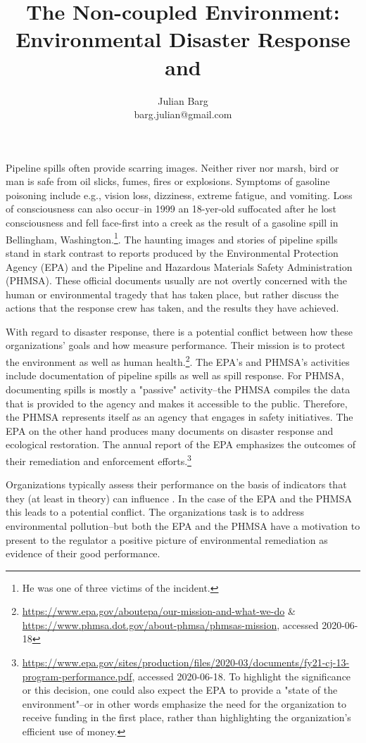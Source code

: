 \documentclass[12pt, man, natbib]{apa6}
\title{The Non-coupled Environment: Environmental Disaster Response and  }
\author{Julian Barg\\barg.julian@gmail.com}
\affiliation{Ivey Business School}
\begin{document}
	
	\maketitle
	
	\singlespacing
	
	\section{}

	Pipeline spills often provide scarring images. Neither river nor marsh, bird or man is safe from oil slicks, fumes, fires or explosions. Symptoms of gasoline poisoning include e.g., vision loss, dizziness, extreme fatigue, and vomiting. Loss of consciousness can also occur--in 1999 an 18-yer-old suffocated after he lost consciousness and fell face-first into a creek as the result of a gasoline spill in Bellingham, Washington.\footnote{He was one of three victims of the incident.}. The haunting images and stories of pipeline spills stand in stark contrast to reports produced by the Environmental Protection Agency (EPA) and the Pipeline and Hazardous Materials Safety Administration (PHMSA). These official documents usually are not overtly concerned with the human or environmental tragedy that has taken place, but rather discuss the actions that the response crew has taken, and the results they have achieved.
	
	With regard to disaster response, there is a potential conflict between how these organizations' goals and how measure performance. Their mission is to protect the environment as well as human health.\footnote{\url{https://www.epa.gov/aboutepa/our-mission-and-what-we-do} \& \url{https://www.phmsa.dot.gov/about-phmsa/phmsas-mission}, accessed 2020-06-18}. The EPA's and PHMSA's activities include documentation of pipeline spills as well as spill response. For PHMSA, documenting spills is mostly a "passive" activity--the PHMSA compiles the data that is provided to the agency and makes it accessible to the public. Therefore, the PHMSA represents itself as an agency that engages in safety initiatives. The EPA on the other hand produces many documents on disaster response and ecological restoration. The annual report of the EPA emphasizes the outcomes of their remediation and enforcement efforts.\footnote{\url{https://www.epa.gov/sites/production/files/2020-03/documents/fy21-cj-13-program-performance.pdf}, accessed 2020-06-18. To highlight the significance or this decision, one could also expect the EPA to provide a "state of the environment"--or in other words emphasize the need for the organization to receive funding in the first place, rather than highlighting the organization's efficient use of money.}
	
	Organizations typically assess their performance on the basis of indicators that they (at least in theory) can influence \citep{March1963}. In the case of the EPA and the PHMSA this leads to a potential conflict. The organizations task is to address environmental pollution--but both the EPA and the PHMSA have a motivation to present to the regulator a positive picture of environmental remediation as evidence of their good performance. 
	

\end{document}
